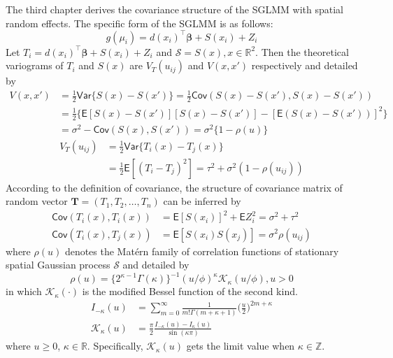 \documentclass[12pt,a4paper,UTF8,twoside]{book}
\begin{document}
The third chapter derives the covariance structure of the SGLMM with
spatial random effects. The specific form of the SGLMM is as follows:
\begin{equation}
g(\mu_i) = d(x_i)^{\top}\boldsymbol{\beta} + S(x_i) + Z_i \label{eq:SGLMM-en}
\end{equation} \noindent Let
\(T_{i} = d(x_i)^{\top}\boldsymbol{\beta} + S(x_i) + Z_i\) and
\(\mathcal{S} = S(x), x \in \mathbb{R}^2\). Then the theoretical
variograms of \(T_{i}\) and \(S(x)\) are \(V_{T}(u_{ij})\) and
\(V(x,x')\) respectively and detailed by \begin{equation}
\begin{aligned}
V(x,x') 
      &= \frac{1}{2}\mathsf{Var}\{S(x)-S(x')\} = \frac{1}{2}\mathsf{Cov}(S(x)-S(x'),S(x)-S(x'))\\
      &= \frac{1}{2}\{\mathsf{E}[S(x)-S(x')][S(x)-S(x')]-[\mathsf{E}(S(x)-S(x'))]^2\}\\
      &= \sigma^2-\mathsf{Cov}(S(x),S(x'))=\sigma^2\{1-\rho(u)\}
\end{aligned}
\end{equation} \begin{equation}
\begin{aligned}
V_{T}(u_{ij})
      &= \frac{1}{2}\mathsf{Var}\{T_{i}(x)-T_{j}(x)\} \\
      &= \frac{1}{2}\mathsf{E}[(T_{i}-T_{j})^2]=\tau^2+\sigma^2(1-\rho(u_{ij})) 
\end{aligned}
\end{equation} \noindent According to the definition of covariance, the
structure of covariance matrix of random vector
\(\mathbf{T} = (T_1,T_2,\ldots,T_n)\) can be inferred by
\begin{equation}
\begin{aligned}
\mathsf{Cov}(T_{i}(x),T_{i}(x)) &= \mathsf{E}[S(x_i)]^2 + \mathsf{E}Z_{i}^{2}= \sigma^2+\tau^2 \\
\mathsf{Cov}(T_{i}(x),T_{j}(x)) &= \mathsf{E}[S(x_i)S(x_j)]  = \sigma^2\rho(u_{ij})
\end{aligned}
\end{equation} \noindent where \(\rho(u)\) denotes the Matérn family of
correlation functions of stationary spatial Gaussian process
\(\mathcal{S}\) and detailed by \begin{equation}
\rho(u)=\{2^{\kappa -1}\Gamma(\kappa)\}^{-1}(u/\phi)^{\kappa}\mathcal{K}_{\kappa}(u/\phi),u > 0 \label{eq:matern-en}
\end{equation} \noindent in which \(\mathcal{K}_{\kappa}(\cdot)\) is the
modified Bessel function of the second kind. \begin{equation}
\begin{aligned}
I_{-\kappa}(u) & =  \sum_{m=0}^{\infty} \frac{1}{m!\Gamma(m + \kappa + 1)} \big(\frac{u}{2}\big)^{2m + \kappa} \\
\mathcal{K}_{\kappa}(u) & = \frac{\pi}{2} \frac{I_{-\kappa}(u) - I_{\kappa}(u)}{\sin (\kappa \pi)}
\end{aligned} \label{eq:besselK-function}
\end{equation} \noindent where \(u \geq 0\), \(\kappa \in \mathbb{R}\).
Specifically, \(\mathcal{K}_{\kappa}(u)\) gets the limit value when
\(\kappa \in \mathbb{Z}\).
\end{document}
